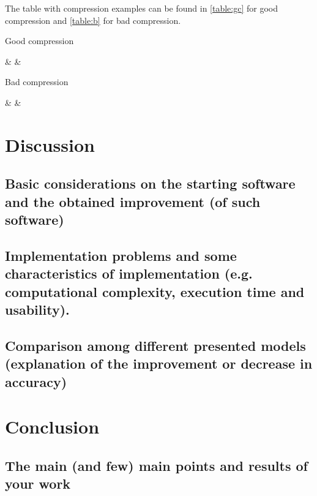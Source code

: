 \documentclass[a4paper,12pt,oneside]{article}
\begin{document}
The table with compression examples can be found in \cref{table:gc} for good compression and \cref{table:b} for bad compression.

\begin{table}
\centering
\caption{Good compression}
\label{table:gc}
%
{\Phrase & \True & \Predicted \\\midrule}%
\end{table}


\begin{table}
\centering
\caption{Bad compression}
\label{table:b}
%
{\Phrase & \True & \Predicted \\\midrule}%
\end{table}

\section {Discussion}

\subsection {Basic considerations on the starting software and the obtained improvement (of such software)}

\subsection {Implementation problems and some characteristics of implementation (e.g. computational complexity, execution time and usability).}

\subsection {Comparison among different presented models  (explanation of the improvement or decrease in accuracy)}

\section {Conclusion}

\subsection {The  main  (and few) main points and results of your work}

 
\end{document}
